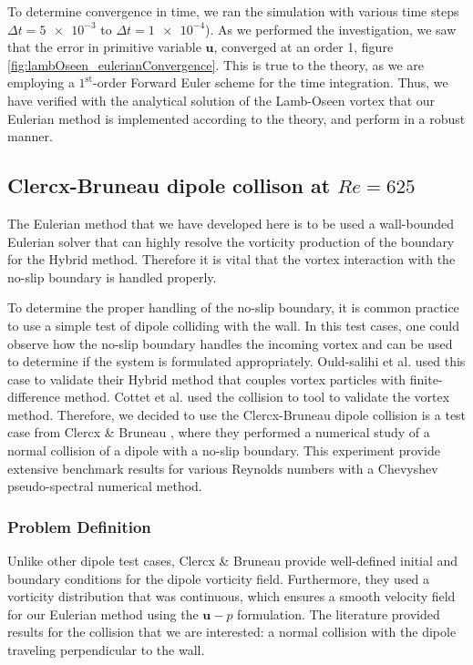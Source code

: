 To determine convergence in time, we ran the simulation with various time steps $\Delta t = \num{5e-3}$ to $\Delta t = \num{1e-4}$). As we performed the investigation, we saw that the error in primitive variable $\mathbf{u}$, converged at an order 1, figure \ref{fig:lambOseen_eulerianConvergence}. This is true to the theory, as we are employing a $1^{\mathrm{st}}$-order Forward Euler scheme for the time integration. Thus, we have verified with the analytical solution of the Lamb-Oseen vortex that our Eulerian method is implemented according to the theory, and perform in a robust manner.

\subsection{Clercx-Bruneau dipole collison at $Re=625$}

The Eulerian method that we have developed here is to be used a wall-bounded Eulerian solver that can highly resolve the vorticity production of the boundary for the Hybrid method. Therefore it is vital that the vortex interaction with the no-slip boundary is handled properly.

To determine the proper handling of the no-slip boundary, it is common practice to use a simple test of dipole colliding with the wall. In this test cases, one could observe how the no-slip boundary handles the incoming vortex and can be used to determine if the system is formulated appropriately.  Ould-salihi et al. \cite{Ould-Salihi2001a} used this case to validate their Hybrid method that couples vortex particles with finite-difference method. Cottet et al. \cite{Cottet2000b} used the collision to tool to validate the vortex method. Therefore, we decided to use the Clercx-Bruneau dipole collision is a test case from Clercx \& Bruneau \cite{Clercx2006a}, where they performed a numerical study of a normal collision of a dipole with a no-slip boundary. This experiment provide extensive benchmark results for various Reynolds numbers with a Chevyshev pseudo-spectral numerical method. 

\subsubsection*{Problem Definition}

Unlike other dipole test cases, Clercx \& Bruneau provide well-defined initial and boundary conditions for the dipole vorticity field. Furthermore, they used a vorticity distribution that was continuous, which ensures a smooth velocity field for our Eulerian method using the $\mathbf{u}-p$ formulation. The literature provided results for the collision that we are interested: a normal collision with the dipole traveling perpendicular to the wall.

